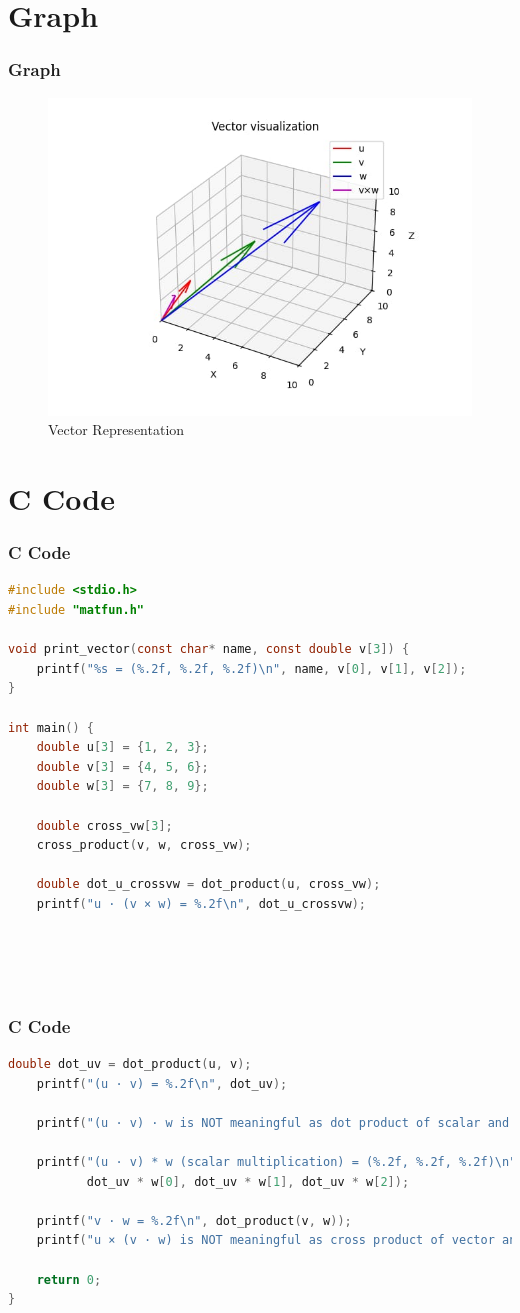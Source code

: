 \documentclass{beamer}
\theoremstyle{remark}
\numberwithin{equation}{section}
\begin{document}
\section{Graph}
\begin{frame}
    \frametitle{Graph}
    \begin{figure}[htbp]
    \centering
    \includegraphics[width=0.65\linewidth]{FIG/fig1.png}
    \caption{Vector Representation}
    \label{fig:FIG/fig1.png}
\end{figure}
\end{frame}
\section{ C Code}
\begin{frame}[fragile]
\frametitle{C Code }
\begin{lstlisting}[language=C]
#include <stdio.h>
#include "matfun.h"

void print_vector(const char* name, const double v[3]) {
    printf("%s = (%.2f, %.2f, %.2f)\n", name, v[0], v[1], v[2]);
}

int main() {
    double u[3] = {1, 2, 3};
    double v[3] = {4, 5, 6};
    double w[3] = {7, 8, 9};

    double cross_vw[3];
    cross_product(v, w, cross_vw);

    double dot_u_crossvw = dot_product(u, cross_vw);
    printf("u · (v × w) = %.2f\n", dot_u_crossvw);


   
    
\end{lstlisting}
\end{frame}
\begin{frame}[fragile]
\frametitle{C Code }
\begin{lstlisting}[language=C]
 double dot_uv = dot_product(u, v);
    printf("(u · v) = %.2f\n", dot_uv);

    printf("(u · v) · w is NOT meaningful as dot product of scalar and vector.\n");

    printf("(u · v) * w (scalar multiplication) = (%.2f, %.2f, %.2f)\n",
           dot_uv * w[0], dot_uv * w[1], dot_uv * w[2]);

    printf("v · w = %.2f\n", dot_product(v, w));
    printf("u × (v · w) is NOT meaningful as cross product of vector and scalar.\n");

    return 0;
}


\end{lstlisting}
\end{frame}
\end{document}
